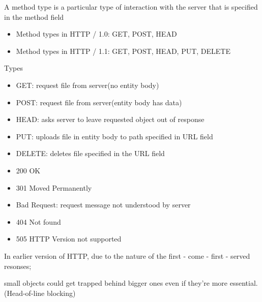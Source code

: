 \documentclass[12pt] {report}
\begin{document}
{
    A method type is a particular type of interaction with the server that is specified in the method field
    \begin{itemize}
\item Method types in HTTP / 1.0:
    GET, POST, HEAD
\item Method types in HTTP / 1.1:
    GET, POST, HEAD, PUT, DELETE
    \end{itemize}
    Types
    \begin{itemize}
\item GET:
    request file from server(no entity body)
\item POST:
    request file from server(entity body has data)
\item HEAD:
    asks server to leave requested object out of response
\item PUT:
    uploads file in entity body to path specified in URL field
\item DELETE:
    deletes file specified in the URL field
    \end{itemize}
}

{
    \begin{itemize}
    \item 200 OK
    \item 301 Moved Permanently
\item Bad Request:
    request message not understood by server
    \item 404 Not found
    \item 505 HTTP Version not supported
    \end{itemize}
}
In earlier version of HTTP, due to the nature of the first - come - first - served resonses;

small objects could get trapped behind bigger ones even if they're more essential. (Head-of-line blocking)
\end{document}
